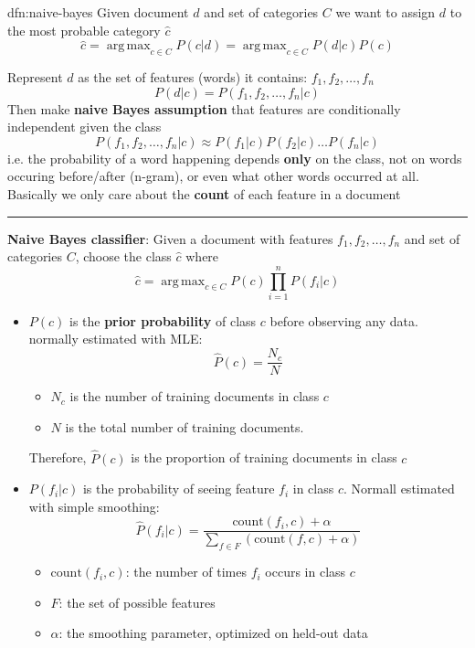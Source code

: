 \documentclass[landscape, 8pt]{extarticle}
\DeclareMathOperator*{\argmax}{arg\,max}
\begin{document}
\begin{multicols}{3}
\begin{dfn}{dfn:naive-bayes}{}
    \vspace{-5pt}
    Given document $d$ and set of categories $C$ we want to assign $d$ to the most probable category $\hat{c}$
    \[\hat{c} = \argmax_{c\in C} P(c | d) = \argmax_{c\in C} P(d|c)P(c)\]

    Represent $d$ as the set of features (words) it contains: $f_{1},f_{2},\dots,f_{n}$
    \[P(d | c) = P(f_{1},f_{2},\dots,f_{n} | c)\]
    Then make \textbf{naive Bayes assumption} that features are conditionally independent given the class
    \[P(f_{1},f_{2},\dots,f_{n}|c) \approx P(f_{1}|c) P(f_{2}|c)\dots P(f_{n}|c)\]
    i.e. the probability of a word happening depends \textbf{only} on the class, not on words occuring before/after (n-gram), or even what other words occurred at all. Basically we only care about the \textbf{count} of each feature in a document

    \vspace{-5pt}
    \noindent\rule{\textwidth}{0.2pt}
    \textbf{Naive Bayes classifier}: Given a document with features $f_{1},f_{2},\dots,f_{n}$ and set of categories $C$, choose the class $\hat{c}$ where
    \[\hat{c} = \argmax_{c\in C} P(c)\prod_{i=1}^{n}P(f_{i}|c)\]
    \begin{itemize}[leftmargin=*]
        \setlength\itemsep{0em}
        \item $P(c)$ is the \textbf{prior probability} of class $c$ before observing any data. normally estimated with MLE:
            \[\hat{P}(c) = \frac{N_{c}}{N}\]
            \begin{itemize}
                \setlength\itemsep{0em}
                \item $N_{c}$ is the number of training documents in class $c$
                \item $N$ is the total number of training documents. 
            \end{itemize}
            \vspace{-5pt}
            Therefore, $\hat{P}(c)$ is the proportion of training documents in class $c$
        \item $P(f_{i}|c)$ is the probability of seeing feature $f_{i}$ in class $c$. Normall estimated with simple smoothing:
            \[\hat{P}(f_{i}|c) = \frac{\text{count}(f_{i}, c) + \alpha}{\sum_{f\in F}(\text{count}(f, c) + \alpha)}\]
            \begin{itemize}
                \setlength\itemsep{0em}
                \item $\text{count}(f_{i}, c)$: the number of times $f_{i}$ occurs in class $c$
                \item $F$: the set of possible features
                \item $\alpha$: the smoothing parameter, optimized on held-out data
            \end{itemize}


\end{itemize}
\end{dfn}
\end{multicols}
\end{document}
